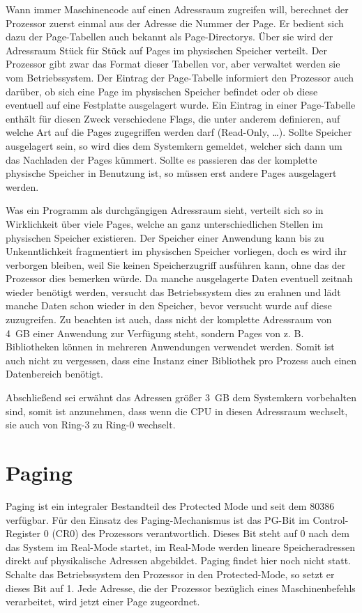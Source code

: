 \documentclass[12pt]{book}
\begin{document}
Wann immer Maschinencode auf einen Adressraum zugreifen will, berechnet der
Prozessor zuerst einmal aus der Adresse die Nummer der Page. Er bedient sich dazu
der Page-Tabellen auch bekannt als Page-Directorys. Über sie wird der
Adressraum Stück für Stück auf Pages im physischen Speicher verteilt. Der
Prozessor gibt zwar das Format dieser Tabellen vor, aber verwaltet werden sie
vom Betriebssystem. Der Eintrag der Page-Tabelle informiert den Prozessor auch
darüber, ob sich eine Page im physischen Speicher befindet oder ob diese
eventuell auf eine Festplatte ausgelagert wurde. Ein Eintrag in einer
Page-Tabelle enthält für diesen Zweck verschiedene Flags, die unter anderem
definieren, auf welche Art auf die Pages zugegriffen werden darf (Read-Only, …).
Sollte Speicher ausgelagert sein, so wird dies dem Systemkern gemeldet, welcher
sich dann um das Nachladen der Pages kümmert. Sollte es passieren das der
komplette physische Speicher in Benutzung ist, so müssen erst andere Pages
ausgelagert werden.

Was ein Programm als durchgängigen Adressraum sieht, verteilt sich so in
Wirklichkeit über viele Pages, welche an ganz unterschiedlichen Stellen im
physischen Speicher existieren. Der Speicher einer Anwendung kann bis zu
Unkenntlichkeit fragmentiert im physischen Speicher vorliegen, doch es wird ihr
verborgen bleiben, weil Sie keinen Speicherzugriff ausführen kann, ohne das der
Prozessor dies bemerken würde. Da manche ausgelagerte Daten eventuell zeitnah
wieder benötigt werden, versucht das Betriebssystem dies zu erahnen und lädt
manche Daten schon wieder in den Speicher, bevor versucht wurde auf diese
zuzugreifen. Zu beachten ist auch, dass nicht der komplette Adressraum von 4 GB
einer Anwendung zur Verfügung steht, sondern Pages von z. B. Bibliotheken
können in mehreren Anwendungen verwendet werden. Somit ist auch nicht zu
vergessen, dass eine Instanz einer Bibliothek pro Prozess auch einen
Datenbereich benötigt.

Abschließend sei erwähnt das Adressen größer 3 GB dem Systemkern vorbehalten
sind, somit ist anzunehmen, dass wenn die CPU in diesen Adressraum wechselt, sie
auch von Ring-3 zu Ring-0 wechselt.

\section{Paging}

Paging ist ein integraler Bestandteil des Protected Mode und seit dem 80386
verfügbar. Für den Einsatz des Paging-Mechanismus ist das PG-Bit im
Control-Register 0 (CR0) des Prozessors verantwortlich. Dieses Bit steht auf 0
nach dem das System im Real-Mode startet, im Real-Mode werden lineare
Speicheradressen direkt auf physikalische Adressen abgebildet. Paging findet
hier noch nicht statt. Schalte das Betriebssystem den Prozessor in den
Protected-Mode, so setzt er dieses Bit auf 1. Jede Adresse, die der Prozessor
bezüglich eines Maschinenbefehls verarbeitet, wird jetzt einer Page zugeordnet.
\end{document}
